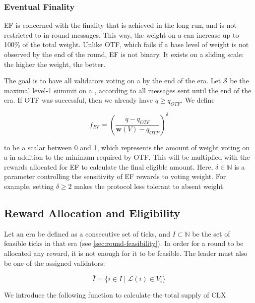 \subsubsection*{Eventual Finality}
\label{sec:eventual-finality}

EF is concerned with the finality that is achieved in the long run, and is not restricted to in-round messages. This way, the weight on a \PROP can increase up to 100\% of the total weight. Unlike OTF, which fails if a base level of weight is not observed by the end of the round, EF is not binary. It exists on a sliding scale: the higher the weight, the better.

The goal is to have all validators voting on a \PROP by the end of the era. Let $\mathcal{S}$ be the maximal level-1 summit on a \PROP, according to all messages sent until the end of the era. If OTF was successful, then we already have $q\geq q_{OTF}$. We define

\begin{equation}
f_{EF} = \left(\frac{q - q_{OTF}}{\boldsymbol{w}(V)-q_{OTF}}\right)^\delta
\end{equation}

to be a scalar between 0 and 1, which represents the amount of weight voting on a \PROP in addition to the minimum required by OTF. This will be multiplied with the rewards allocated for EF to calculate the final eligible amount. Here, $\delta \in \mathbb{N}$ is a parameter controlling the sensitivity of EF rewards to voting weight. For example, setting $\delta \geq 2$ makes the protocol less tolerant to absent weight.

\subsection{Reward Allocation and Eligibility}
\label{sec:reward-allocation-eligibility}

Let an era be defined as a consecutive set of ticks, and $I\subset\mathbb{N}$ be the set of feasible ticks in that era (see \ref{sec:round-feasibility}). In order for a round to be allocated any reward, it is not enough for it to be feasible. The leader must also be one of the assigned validators:

\begin{equation}
\bar{I}=\{i\in I \mid \mathcal{L}(i) \in V_i\}
\end{equation}

We introduce the following function to calculate the total supply of CLX

